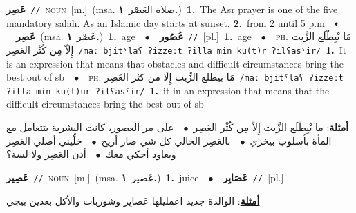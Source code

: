 \documentclass[10pt,a4paper,twoside]{article} %
\begin{document}
\begin{multicols}{2}
{\setlength\topsep{0pt}\textbf{\foreignlanguage{arabic}{عَصِر}}\ {\color{gray}\texttt{//}\color{black}}\ \textsc{noun}\ [m.]\ \color{gray}(msa. \foreignlanguage{arabic}{صلاة العَصْر}~\foreignlanguage{arabic}{\textbf{١.}})\color{black}\ \textbf{1.}~The Asr prayer is one of the five mandatory salah. As an Islamic day starts at sunset.  \textbf{2.}~from 2 until 5 p.m\ \ $\smblkdiamond$\ \ \setlength\topsep{0pt}\textbf{\foreignlanguage{arabic}{عَصِر}}\ \color{gray}(msa. \foreignlanguage{arabic}{عَصْر}~\foreignlanguage{arabic}{\textbf{١.}})\color{black}\ \textbf{1.}~age\ \ $\bullet$\ \ \setlength\topsep{0pt}\textbf{\foreignlanguage{arabic}{عُصُور}}\ {\color{gray}\texttt{//}\color{black}}\ [pl.]\ \textbf{1.}~age\ \ $\bullet$\ \ \textsc{ph.} \color{gray} \foreignlanguage{arabic}{مَا بْيِطْلَع الزَّيت إِلَاّ مِن كُثْر العَصِر}\color{black}\ {\color{gray}\texttt{/{\sffamily maː bjitˤlaʕ ʔizzeːt ʔilla min ku(t)r ʔilʕasˤir}/}\color{black}}\ \textbf{1.}~It is an expression that means that obstacles and difficult circumstances bring the best out of sb\ \ $\bullet$\ \ \textsc{ph.} \color{gray} \foreignlanguage{arabic}{مَا بيطلع الزِّيت إِلَا من كثر العَصِر}\color{black}\ {\color{gray}\texttt{/{\sffamily maː bjitˤlaʕ ʔizzeːt ʔilla min ku(t)ur ʔilʕasˤir}/}\color{black}}\ \textbf{1.}~it in an expression that means that the difficult circumstances bring the best out of sb\  \begin{flushright}\color{gray}\foreignlanguage{arabic}{\textbf{\underline{\foreignlanguage{arabic}{أمثلة}}}: ما بْيِطْلَع الزَّيت إِلاّ مِن كُثْر العَصِر\ $\bullet$\ \  على مر العصور، كانت البشرية بتتعامل مع المأة بأسلوب بيخزي\ $\bullet$\ \  بالعَصِر الحالي كل شي صار أريح\ $\bullet$\ \  خلِّيني أصلي العَصِر وبعاود أحكي معك\ $\bullet$\ \  أذن العَصِر ولا لسة؟}\end{flushright}\color{black}} \vspace{2mm}

{\setlength\topsep{0pt}\textbf{\foreignlanguage{arabic}{عَصِير}}\ {\color{gray}\texttt{//}\color{black}}\ \textsc{noun}\ [m.]\ \color{gray}(msa. \foreignlanguage{arabic}{عَصير}~\foreignlanguage{arabic}{\textbf{١.}})\color{black}\ \textbf{1.}~juice\ \ $\bullet$\ \ \setlength\topsep{0pt}\textbf{\foreignlanguage{arabic}{عَصَايِر}}\ {\color{gray}\texttt{//}\color{black}}\ [pl.]\  \begin{flushright}\color{gray}\foreignlanguage{arabic}{\textbf{\underline{\foreignlanguage{arabic}{أمثلة}}}: الوالدة جديد اعمليلها عَصايِر وشوربات والأكل بعدين بيجي}\end{flushright}\color{black}} \vspace{2mm}


\end{multicols}
\end{document}
